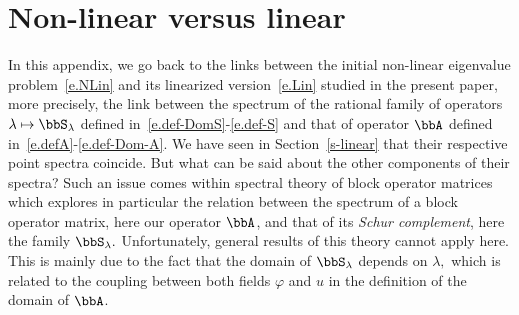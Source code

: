 \appendix
\section{Non-linear versus linear}\label{s-appendix}
In this appendix, we go back to the links between the initial non-linear eigenvalue problem~\eqref{e.NLin} and its linearized version~\eqref{e.Lin} studied in the present paper, more precisely, the link between the spectrum of the rational family of operators $\lambda \mapsto \bbS_\lambda$ defined in~\eqref{e.def-DomS}-\eqref{e.def-S} and that of operator $\bbA$ defined in~\eqref{e.defA}-\eqref{e.def-Dom-A}. We have seen in Section~\ref{s-linear} that their respective point spectra coincide. But what can be said about the other components of their spectra? Such an issue comes within spectral theory of block operator matrices~\cite{Tre-08} which explores in particular the relation between the spectrum of a block operator matrix, here our operator $\bbA$, and that of its \emph{Schur complement}, here the family $\bbS_\lambda.$ Unfortunately, general results of this theory cannot apply here. This is mainly due to the fact that the domain of $\bbS_\lambda$ depends on $\lambda,$ which is related to the coupling between both fields $\varphi$ and $u$ in the definition of the domain of $\bbA$.

